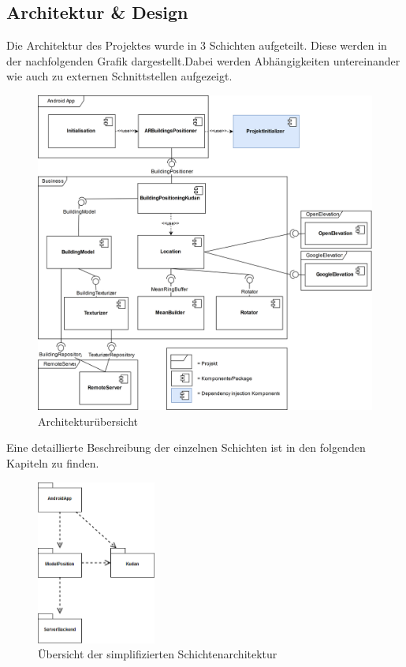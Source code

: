 \documentclass[a4paper]{scrreprt}
\begin{document}
\subsection{Architektur \& Design}
Die Architektur des Projektes wurde in 3 Schichten aufgeteilt. Diese werden in der nachfolgenden Grafik dargestellt.Dabei werden Abhängigkeiten untereinander wie auch zu externen Schnittstellen aufgezeigt.

\begin{figure}[h!]
	\includegraphics[keepaspectratio, width=\textwidth]{ArchitekturOverviewV0_4.png}
	\caption{Architekturübersicht}
\end{figure}

Eine detaillierte Beschreibung der einzelnen Schichten ist in den folgenden Kapiteln zu finden.

\begin{figure}[h!]
  \center
  \includegraphics[width=0.35\textwidth]{SchichtenDiagramm.png}
  \caption{Übersicht der simplifizierten Schichtenarchitektur}
\end{figure}
\end{document}
